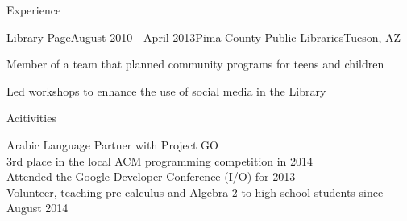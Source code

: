 \documentclass{resume} %
\begin{document}
\begin{rSection}{Experience}

\begin{rSubsection}{Library Page}{August 2010 - April 2013}{Pima County Public Libraries}{Tucson, AZ}
	\item Member of a team that planned community programs for teens and children
	\item Led workshops to enhance the use of social media in the Library
\end{rSubsection}

\end{rSection}



\begin{rSection}{Acitivities}

Arabic Language Partner with Project GO \\
3rd place in the local ACM programming competition in 2014 \\
Attended the Google Developer Conference (I/O) for 2013 \\
Volunteer, teaching pre-calculus and Algebra 2 to high school students since August 2014 \\
\end{rSection}

\end{document}
